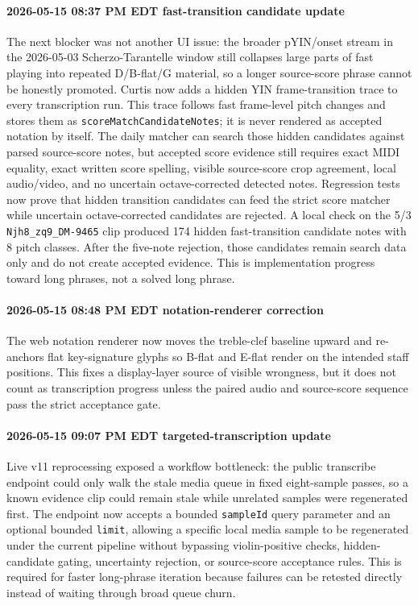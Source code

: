 \paragraph{2026-05-15 08:37 PM EDT fast-transition candidate update} The next blocker was not another UI issue: the broader pYIN/onset stream in the 2026-05-03 Scherzo-Tarantelle window still collapses large parts of fast playing into repeated D/B-flat/G material, so a longer source-score phrase cannot be honestly promoted. Curtis now adds a hidden YIN frame-transition trace to every transcription run. This trace follows fast frame-level pitch changes and stores them as \texttt{scoreMatchCandidateNotes}; it is never rendered as accepted notation by itself. The daily matcher can search those hidden candidates against parsed source-score notes, but accepted score evidence still requires exact MIDI equality, exact written score spelling, visible source-score crop agreement, local audio/video, and no uncertain octave-corrected detected notes. Regression tests now prove that hidden transition candidates can feed the strict score matcher while uncertain octave-corrected candidates are rejected. A local check on the 5/3 \texttt{Njh8\_zq9\_DM-9465} clip produced 174 hidden fast-transition candidate notes with 8 pitch classes. After the five-note rejection, those candidates remain search data only and do not create accepted evidence. This is implementation progress toward long phrases, not a solved long phrase.

\paragraph{2026-05-15 08:48 PM EDT notation-renderer correction} The web notation renderer now moves the treble-clef baseline upward and re-anchors flat key-signature glyphs so B-flat and E-flat render on the intended staff positions. This fixes a display-layer source of visible wrongness, but it does not count as transcription progress unless the paired audio and source-score sequence pass the strict acceptance gate.

\paragraph{2026-05-15 09:07 PM EDT targeted-transcription update} Live v11 reprocessing exposed a workflow bottleneck: the public transcribe endpoint could only walk the stale media queue in fixed eight-sample passes, so a known evidence clip could remain stale while unrelated samples were regenerated first. The endpoint now accepts a bounded \texttt{sampleId} query parameter and an optional bounded \texttt{limit}, allowing a specific local media sample to be regenerated under the current pipeline without bypassing violin-positive checks, hidden-candidate gating, uncertainty rejection, or source-score acceptance rules. This is required for faster long-phrase iteration because failures can be retested directly instead of waiting through broad queue churn.

